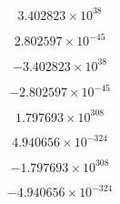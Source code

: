 \documentclass{article}
\begin{document}
\[3.402823 \times 10^{38}\]
\pagebreak

\[2.802597 \times 10^{-45}\]
\pagebreak

\[-3.402823 \times 10^{38}\]
\pagebreak

\[-2.802597 \times 10^{-45}\]
\pagebreak

\[1.797693 \times 10^{308}\]
\pagebreak

\[4.940656 \times 10^{-324}\]
\pagebreak

\[-1.797693 \times 10^{308}\]
\pagebreak

\[-4.940656 \times 10^{-324}\]
\pagebreak
\end{document}
